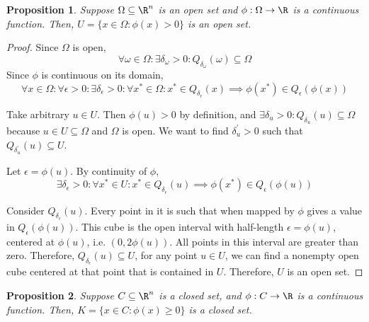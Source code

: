 \documentclass[letterpaper,11pt]{article}
\newtheorem{prop}{Proposition}
\begin{document}
\begin{prop}
  Suppose $\Omega \subseteq \R^n$ is an open set and $\phi : \Omega \to \R$ is
  a continuous function. Then, $U = \{ x \in \Omega : \phi(x) > 0\}$ is an open
  set.
\end{prop}

\begin{proof}
  Since $\Omega$ is open,
  \begin{equation*}
    \forall \omega \in \Omega : \exists \delta_\omega > 0 :
    Q_{\delta_\omega}(\omega) \subseteq \Omega
  \end{equation*}
  Since $\phi$ is continuous on its domain,
  \begin{equation*}
    \forall x \in \Omega :
    \forall \epsilon > 0 :
    \exists \delta_\epsilon > 0:
    \forall x^* \in \Omega :
    x^* \in Q_{\delta_\epsilon}(x) \implies \phi(x^*) \in Q_\epsilon(\phi(x))
  \end{equation*}

  Take arbitrary $u \in U$.
  Then $\phi(u) > 0$ by definition,
  and $\exists \delta_u > 0 : Q_{\delta_u}(u) \subseteq \Omega$ because
  $u \in U \subseteq \Omega$ and $\Omega$ is open.
  We want to find $\delta_u^\prime > 0$ such that
  $Q_{\delta_u^\prime}(u) \subseteq U$.

  Let $\epsilon = \phi(u)$.
  By continuity of $\phi$,
  \begin{equation*}
    \exists \delta_\epsilon > 0 :
    \forall x^* \in U :
    x^* \in Q_{\delta_\epsilon}(u) \implies \phi(x^*) \in Q_\epsilon(\phi(u))
  \end{equation*}

  Consider $Q_{\delta_\epsilon}(u)$. Every point in it is such that when mapped
  by $\phi$ gives a value in $Q_\epsilon(\phi(u))$. This cube is the open
  interval with half-length $\epsilon = \phi(u)$, centered at $\phi(u)$, i.e.
  $(0, 2\phi(u))$. All points in this interval are greater than zero.
  Therefore, $Q_{\delta_\epsilon}(u) \subseteq U$,
  for any point $u \in U$, we can find a nonempty open cube centered at
  that point that is contained in $U$. Therefore, $U$ is an open set.
\end{proof}

\begin{prop}
  Suppose $C \subseteq \R^n$ is a closed set, and $\phi : C \to \R$ is a
  continuous function. Then, $K = \{ x \in C : \phi(x) \geq 0 \}$ is a closed
  set.
\end{prop}
\end{document}
